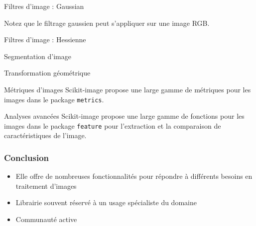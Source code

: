\begin{frame}{Filtres d'image : Gaussian}

  Notez que le filtrage gaussien peut s'appliquer sur une image RGB.
\end{frame}
\begin{frame}{Filtres d'image : Hessienne}
\end{frame}

\begin{frame}{Segmentation d'image}
  
\end{frame}

\begin{frame}{Transformation géométrique}
  
\end{frame}

\begin{frame}{Métriques d'images}
  Scikit-image propose une large gamme de métriques pour les images dans le package \texttt{metrics}.
\end{frame}

\begin{frame}{Analyses avancées}
  Scikit-image propose une large gamme de fonctions pour les images dans le package \texttt{feature} pour l'extraction et la comparaison de caractéristiques de l'image.
\end{frame}

\begin{frame}
  \frametitle{Conclusion}
  \begin{itemize}
    \item Elle offre de nombreuses fonctionnalités pour répondre à différents besoins en traitement d'images
    \item Librairie souvent réservé à un usage spécialiste du domaine
    \item Communauté active
  \end{itemize}
\end{frame}